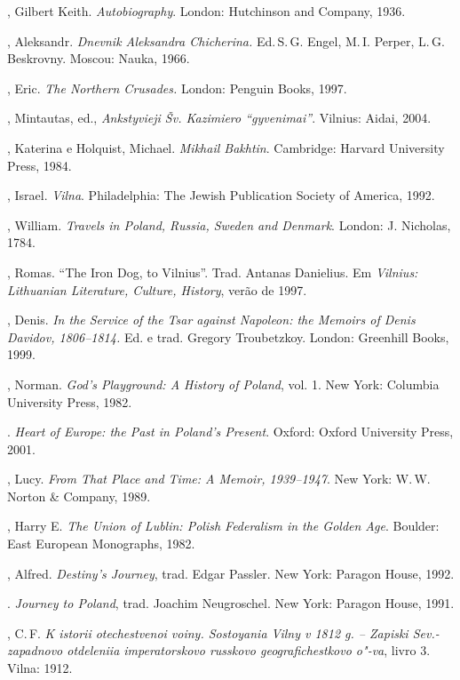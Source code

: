 \begin{bibliohedra}
  , Gilbert Keith. \emph{Autobiography}. London: Hutchinson
  and Company, 1936.

  , Aleksandr. \emph{Dnevnik Aleksandra Chicherina.} Ed.\,S.\,G.
  Engel, M.\,I. Perper, L.\,G. Beskrovny. Moscou: Nauka, 1966.

  , Eric. \emph{The Northern Crusades.} London: Penguin
  Books, 1997.

  , Mintautas, ed., \emph{Ankstyvieji Šv. Kazimiero
  ``gyvenimai''}. Vilnius: Aidai, 2004.

  , Katerina e Holquist, Michael. \emph{Mikhail Bakhtin}.
  Cambridge: Harvard University Press, 1984.

  , Israel. \emph{Vilna}. Philadelphia: The Jewish Publication
  Society of America, 1992.

  , William. \emph{Travels in Poland, Russia, Sweden and Denmark}.
  London: J. Nicholas, 1784.

  , Romas. ``The Iron Dog, to Vilnius''. Trad. Antanas
  Danielius. Em \emph{Vilnius: Lithuanian Literature, Culture, History},
  verão de 1997.

  , Denis. \emph{In the Service of the Tsar against Napoleon: the
  Memoirs of Denis Davidov, 1806--1814.} Ed. e trad. Gregory Troubetzkoy.
  London: Greenhill Books, 1999.

  , Norman. \emph{God's Playground: A History of Poland}, vol. 1.
  New York: Columbia University Press, 1982.

  \titidem. \emph{Heart of Europe: the Past in Poland's Present}.
  Oxford: Oxford University Press, 2001.

  , Lucy. \emph{From That Place and Time: A Memoir,
  1939--1947}. New York: W.\,W. Norton \& Company, 1989.

  , Harry E. \emph{The Union of Lublin: Polish Federalism in
  the Golden Age}. Boulder: East European Monographs, 1982.

  , Alfred. \emph{Destiny's Journey}, trad. Edgar Passler. New
  York: Paragon House, 1992.

  \titidem. \emph{Journey to Poland}, trad. Joachim Neugroschel.
  New York: Paragon House, 1991.

  , C.\,F. \emph{K istorii otechestvenoi voiny. Sostoyania
  Vilny v 1812 g. -- Zapiski Sev.-zapadnovo otdeleniia imperatorskovo
  russkovo geografichestkovo o"-va}, livro 3. Vilna: 1912.


\end{bibliohedra}
